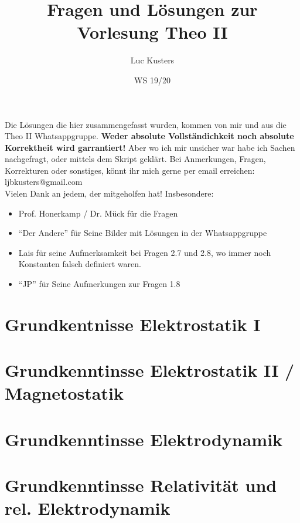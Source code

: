 \documentclass{scrartcl}
\title{Fragen und Lösungen zur Vorlesung Theo II}
\author{Luc Kusters}
\date{WS 19/20}
\newcommand{\subdir}{subtex}
\begin{document}
\maketitle

\noindent
Die Lösungen die hier zusammengefasst wurden, kommen von mir und
aus die Theo II Whatsappgruppe. 
\textbf{Weder absolute Vollständichkeit noch absolute Korrektheit wird garrantiert!} Aber wo ich mir unsicher war habe ich Sachen nachgefragt, oder 
mittels dem Skript geklärt.
Bei Anmerkungen, Fragen, Korrekturen oder sonstiges, könnt ihr mich gerne 
per email erreichen:\\ 
ljbkusters@gmail.com \\

\noindent
Vielen Dank an jedem, der mitgeholfen hat! Insbesondere:
\begin{itemize}
  \item Prof. Honerkamp / Dr. Mück für die Fragen
  \item ``Der Andere'' für Seine Bilder mit Lösungen in der Whatsappgruppe
  \item Lais für seine Aufmerksamkeit bei Fragen 2.7 und 2.8, wo immer noch Konstanten falsch definiert waren.
  \item ``JP'' für Seine Aufmerkungen zur Fragen 1.8
\end{itemize}

\clearpage
\newpage
\setcounter{page}{1}
\tableofcontents
\newpage

\section{Grundkentnisse Elektrostatik I}

\newpage
\section{Grundkenntinsse Elektrostatik II / Magnetostatik}

\newpage
\section{Grundkenntinsse Elektrodynamik}

\newpage
\section{Grundkenntinsse Relativität und rel. Elektrodynamik}

\end{document}
